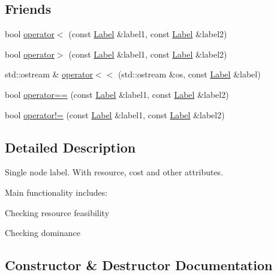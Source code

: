 \subsection*{Friends}
\begin{DoxyCompactItemize}
\item 
bool \hyperlink{classlabelling_1_1Label_aac0781be66b1d133b633cef3f60f8183}{operator$<$} (const \hyperlink{classlabelling_1_1Label}{Label} \&label1, const \hyperlink{classlabelling_1_1Label}{Label} \&label2)
\item 
bool \hyperlink{classlabelling_1_1Label_a7bd46e6920cac7ede4b725f2d33fb12b}{operator$>$} (const \hyperlink{classlabelling_1_1Label}{Label} \&label1, const \hyperlink{classlabelling_1_1Label}{Label} \&label2)
\item 
std\+::ostream \& \hyperlink{classlabelling_1_1Label_ae52256a096ed1acaf1afaba6458b42ca}{operator$<$$<$} (std\+::ostream \&os, const \hyperlink{classlabelling_1_1Label}{Label} \&label)
\item 
bool \hyperlink{classlabelling_1_1Label_abc60b45b5a5310043283c0e6c694cc92}{operator==} (const \hyperlink{classlabelling_1_1Label}{Label} \&label1, const \hyperlink{classlabelling_1_1Label}{Label} \&label2)
\item 
bool \hyperlink{classlabelling_1_1Label_a48813c4c8ca8174edcdf9cf34358b442}{operator!=} (const \hyperlink{classlabelling_1_1Label}{Label} \&label1, const \hyperlink{classlabelling_1_1Label}{Label} \&label2)
\end{DoxyCompactItemize}


\subsection{Detailed Description}
Single node label. With resource, cost and other attributes.

Main functionality includes\+:
\begin{DoxyItemize}
\item Checking resource feasibility
\item Checking dominance 
\end{DoxyItemize}

\subsection{Constructor \& Destructor Documentation}
\mbox{\label{classlabelling_1_1Label_a3728b76c8b32589e04ecaac821f11733}} 
